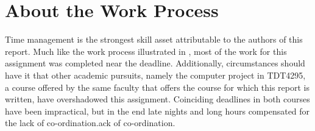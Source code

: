 \section{About the Work Process}

Time management is the strongest skill asset attributable to the authors of this report.
Much like the work process illustrated in \cite{assignment-1}, most of the work for this assignment was completed near the deadline.
Additionally, circumstances should have it that other academic pursuits, namely the computer project in TDT4295, a course offered by the same faculty that offers the course for which this report is written, have overshadowed this assignment.
Coinciding deadlines in both courses have been impractical, but in the end late nights and long hours compensated for the lack of co-ordination.ack of co-ordination.
